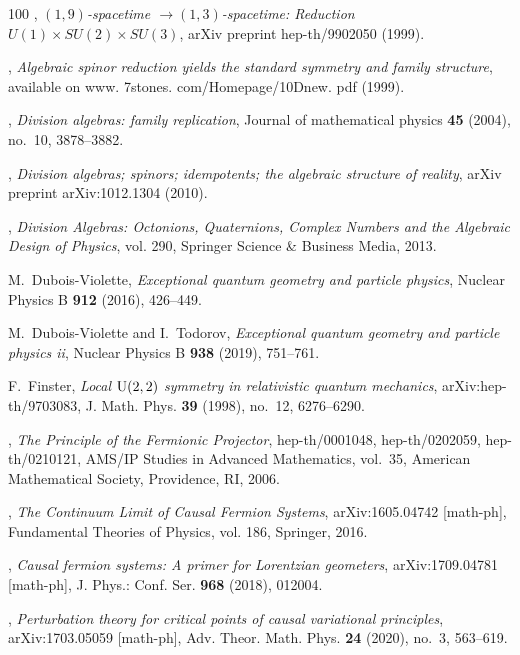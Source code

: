 \documentclass[reqno,11pt]{amsart}
\numberwithin{equation}{section}
\newcommand{\1}{\mbox{\rm 1 \hspace{-1.05 em} 1}}
\begin{document}
{\begin{thebibliography}{100}
\bysame, \emph{{$(1,9)$-spacetime $\rightarrow(1,3)$-spacetime: Reduction
  $U(1)\times SU(2)\times SU(3)$}}, arXiv preprint hep-th/9902050 (1999).

\bysame, \emph{Algebraic spinor reduction yields the standard symmetry and
  family structure}, available on www. 7stones. com/Homepage/10Dnew. pdf
  (1999).

\bysame, \emph{Division algebras: family replication}, Journal of mathematical
  physics \textbf{45} (2004), no.~10, 3878--3882.

\bysame, \emph{Division algebras; spinors; idempotents; the algebraic structure
  of reality}, arXiv preprint arXiv:1012.1304 (2010).

\bysame, \emph{{Division Algebras: Octonions, Quaternions, Complex Numbers and
  the Algebraic Design of Physics}}, vol. 290, Springer Science \& Business
  Media, 2013.

M.~Dubois-Violette, \emph{Exceptional quantum geometry and particle physics},
  Nuclear Physics B \textbf{912} (2016), 426--449.

M.~Dubois-Violette and I.~Todorov, \emph{Exceptional quantum geometry and
  particle physics ii}, Nuclear Physics B \textbf{938} (2019), 751--761.

F.~Finster, \emph{Local {$\rm U(2,2)$} symmetry in relativistic quantum
  mechanics}, arXiv:hep-th/9703083, J. Math. Phys. \textbf{39} (1998), no.~12,
  6276--6290.

\bysame, \emph{The {P}rinciple of the {F}ermionic {P}rojector}, hep-th/0001048,
  hep-th/0202059, hep-th/0210121, AMS/IP Studies in Advanced Mathematics,
  vol.~35, American Mathematical Society, Providence, RI, 2006.

\bysame, \emph{The {C}ontinuum {L}imit of {C}ausal {F}ermion {S}ystems},
  arXiv:1605.04742 [math-ph], Fundamental Theories of Physics, vol. 186,
  Springer, 2016.

\bysame, \emph{Causal fermion systems: {A} primer for {L}orentzian geometers},
  arXiv:1709.04781 [math-ph], J. Phys.: Conf. Ser. \textbf{968} (2018), 012004.

\bysame, \emph{Perturbation theory for critical points of causal variational
  principles}, arXiv:1703.05059 [math-ph], Adv. Theor. Math. Phys. \textbf{24}
  (2020), no.~3, 563--619.


\end{thebibliography}}
\end{document}
